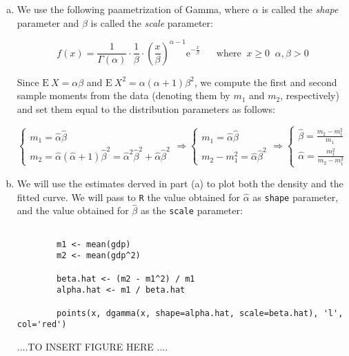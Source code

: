 \documentclass[12pt]{article}
\begin{document}
\begin{enumerate}[(a)]

\item 
We use the following paametrization of Gamma, where $\alpha$ is called the \emph{shape} parameter and $\beta$ is called  the \emph{scale} parameter:

$$
		f(x) = \frac{1}{\Gamma({\alpha})} \cdot \frac{1}{\beta} \cdot  \left( \frac{x}{\beta}\right)^{\alpha - 1} \mathrm{e}^{-\frac{x}{\beta}} \;\;\;\;\;\; \text{where} \;\;  x \ge 0 \;\; \alpha, \beta > 0
$$

Since $ \mathrm{E} \: X = \alpha\beta$ and $ \mathrm{E} \: X^2 = \alpha (\alpha + 1) \beta^2$,  we compute the first and second sample moments from the data (denoting them by $m_1$ and $m_2$, respectively) and set them equal to the distribution parameters as follows:

$$
\begin{cases} m_1   =   \hat{\alpha}\hat{\beta} \\ m_2 = \hat{\alpha} (\hat{\alpha} + 1) \hat{\beta}^2 =\hat{\alpha}^2 \hat{\beta}^2 + \hat{\alpha}\hat{\beta}^2
\end{cases}
\Rightarrow
\begin{cases}  m_1 =\hat{\alpha}\hat{\beta} \\  m_2 -  m_1^2    =  \hat{\alpha}\hat{\beta}^2 
\end{cases}
\Rightarrow
\begin{cases} \hat{\beta}  = \frac{m_2 -  m_1^2}{m_1} \\  \hat{\alpha}  = \frac{m_1^2}{m_2 - m_1^2}
\end{cases}
$$
\item
We will use the estimates derved in part (a) to plot both the density and the fitted curve. We will pass to \texttt{R} the value obtained for $\hat{\alpha}$ as \texttt{shape} parameter, and the value obtained for $\hat{\beta}$ as the \texttt{scale} parameter:


\begin{verbatim}
 
		m1 <- mean(gdp)
		m2 <- mean(gdp^2)

		beta.hat <- (m2 - m1^2) / m1
		alpha.hat <- m1 / beta.hat

		points(x, dgamma(x, shape=alpha.hat, scale=beta.hat), 'l', col='red')
\end{verbatim}

....TO INSERT FIGURE HERE ....


\end{enumerate}
\end{document}
